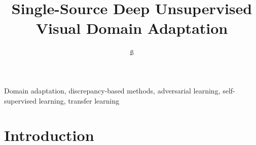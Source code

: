 \documentclass[conference]{IEEEtran}
\begin{document}
\title{Single-Source Deep Unsupervised Visual Domain Adaptation}

\author{
ß
}

\maketitle

\begin{abstract}
\end{abstract}

\begin{IEEEkeywords}
Domain adaptation, discrepancy-based methods, adversarial learning,
self-supervised learning, transfer learning 
\end{IEEEkeywords}

\section{Introduction}
\end{document}
